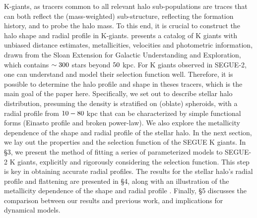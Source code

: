 \documentclass[12pt,preprint]{aastex}
\begin{document}
K-giants, as tracers common to all relevant halo sub-populations are traces that can both reflect the (mass-weighted) sub-structure, reflecting the formation history, and to probe the halo mass. To this end, it is crucial to construct the halo shape and radial profile in K-giants. \citet{Xue2014} presents a catalog of K giants with unbiased distance estimates, metallicities, velocities and photometric information, drawn from the Sloan Extension for Galactic Understanding and Exploration\citep[][SEGUE]{Yanny2009b}, which contains $\rm \sim 300$ stars beyond $\rm 50~$kpc.
For K giants observed in SEGUE-2, one can understand and model their selection function well. Therefore, it is possible to determine the halo profile and shape in theses tracers, which is the main goal of the paper here.
Specifically, we set out to describe stellar halo distribution, presuming the density is stratified on (oblate) spheroids, with a radial profile from $\rm 10-80~$kpc that can be characterized by simple  functional forms (Einasto profile and broken power-law). We also explore the metallicity dependence of the shape and radial profile of the stellar halo.
In the next section, we lay out the properties and the selection function of the SEGUE K giants. In \S 3, we present the method of fitting a series of parameterized models to SEGUE-2 K giants, explicitly and rigorously considering the selection function. This step is key in obtaining accurate radial profiles. The results for the stellar halo's radial profile and flattening are presented in \S 4, along with an illustration of the metallicity dependence of the shape and radial profile . Finally, \S 5 discusses the comparison between our results and previous work, and implications for dynamical models.
\end{document}
